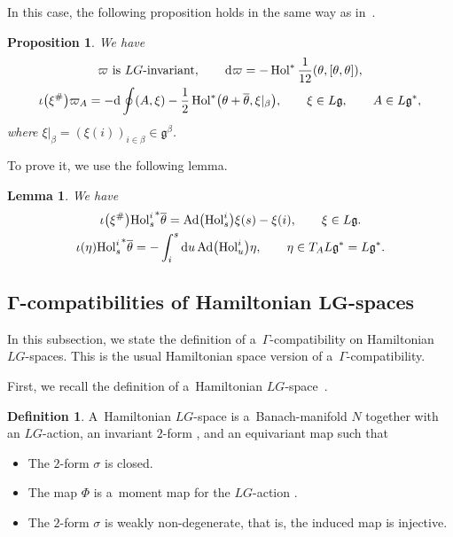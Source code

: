 \documentclass[10pt,a4paper]{amsart}
\numberwithin{equation}{section}
\newtheorem{Lemma}[Theorem]{Lemma}
\newtheorem{Proposition}[Theorem]{Proposition}
\theoremstyle{definition}
\newtheorem{Definition}[Theorem]{Definition}
\newcommand{\Ad}{\operatorname{Ad}}
\newcommand{\Hol}{\operatorname{Hol}}
\begin{document}
In this case, the following proposition holds in the same way as in~\cite[Proposition 8.1]{AMM}.

\begin{Proposition}\label{formula on loop group}We have
 \begin{gather*}
 \varpi\ \text{is}\ LG\text{-invariant}, \qquad
 {\rm d} \varpi = - \Hol ^{*}\frac{1}{12}(\theta,[\theta,\theta]), \\
 \iota\bigl(\xi^{\#}\bigr)\varpi_A = -{\rm d} \oint (A,\xi) - \frac{1}{2}\Hol^*\bigl(\theta + \overline{\theta}, \xi|_\beta\bigr), \qquad \xi \in L\mathfrak{g},\qquad A \in L\mathfrak{g}^*,
 \end{gather*}
 where $\xi|_{\beta} = (\xi(i))_{i \in \beta} \in \mathfrak{g}^{\beta}$.
\end{Proposition}

To prove it, we use the following lemma.

\begin{Lemma}\label{lemma of calc of Hol} We have
 \begin{gather*}
 \iota\bigl(\xi^{\#}\bigr){\Hol^{i}_s}^{*}\overline{\theta} = \Ad\bigl(\Hol^{i}_s\bigr)\xi(s) - \xi(i), \qquad \xi \in L\mathfrak{g}. \\
 \iota(\eta) {\Hol^{i}_s}^*\overline{\theta} = - \int_{i}^{s}{\rm d}u \Ad \bigl(\Hol^{i}_u\bigr)\eta , \qquad \eta \in T_A L\mathfrak{g}^{*}=L\mathfrak{g}^*.
 \end{gather*}
\end{Lemma}


\subsection[Gamma-compatibilities of Hamiltonian LG-spaces]{$\boldsymbol{\Gamma}$-compatibilities of Hamiltonian $\boldsymbol{LG}$-spaces}

In this subsection, we state the definition of a~$\Gamma$-compatibility on Hamiltonian $LG$-spaces.
This is the usual Hamiltonian space version of a~$\Gamma$-compatibility.

First, we recall the definition of a~Hamiltonian $LG$-space~\cite{AMM}.

\begin{Definition} A~Hamiltonian $LG$-space is a~Banach-manifold $N$ together with an $LG$-action, an invariant $2$-form , and an equivariant map  such that
 \begin{itemize}\itemsep=0pt
 \item [(1)] The $2$-form $\sigma$ is closed.
 \item [(2)] The map $\Phi$ is a~moment map for the $LG$-action .
 \item [(3)] The $2$-form $\sigma$ is weakly non-degenerate, that is, the induced map  is injective.
 \end{itemize}
\end{Definition}
\end{document}
